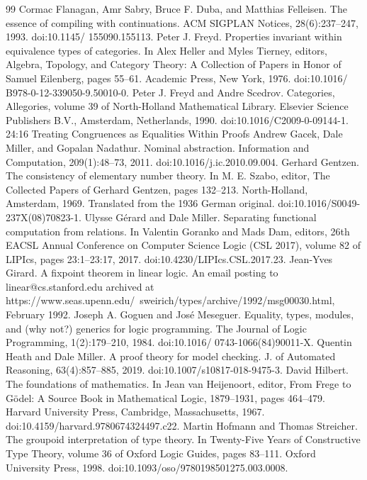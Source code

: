 \begin{thebibliography}{99}
 Cormac Flanagan, Amr Sabry, Bruce F. Duba, and Matthias Felleisen. The essence of compiling with continuations. ACM SIGPLAN Notices, 28(6):237–247, 1993. doi:10.1145/ 155090.155113.
 Peter J. Freyd. Properties invariant within equivalence types of categories. In Alex Heller and Myles Tierney, editors, Algebra, Topology, and Category Theory: A Collection of Papers in Honor of Samuel Eilenberg, pages 55–61. Academic Press, New York, 1976. doi:10.1016/ B978-0-12-339050-9.50010-0.
 Peter J. Freyd and Andre Scedrov. Categories, Allegories, volume 39 of North-Holland Mathematical Library. Elsevier Science Publishers B.V., Amsterdam, Netherlands, 1990. doi:10.1016/C2009-0-09144-1. 24:16   Treating Congruences as Equalities Within Proofs
 Andrew Gacek, Dale Miller, and Gopalan Nadathur. Nominal abstraction. Information and Computation, 209(1):48–73, 2011. doi:10.1016/j.ic.2010.09.004.
 Gerhard Gentzen. The consistency of elementary number theory. In M. E. Szabo, editor, The Collected Papers of Gerhard Gentzen, pages 132–213. North-Holland, Amsterdam, 1969. Translated from the 1936 German original. doi:10.1016/S0049-237X(08)70823-1.
 Ulysse Gérard and Dale Miller. Separating functional computation from relations. In Valentin Goranko and Mads Dam, editors, 26th EACSL Annual Conference on Computer Science Logic (CSL 2017), volume 82 of LIPIcs, pages 23:1–23:17, 2017. doi:10.4230/LIPIcs.CSL.2017.23.
 Jean-Yves Girard. A fixpoint theorem in linear logic. An email posting to linear@cs.stanford.edu archived at https://www.seas.upenn.edu/~sweirich/types/archive/1992/msg00030.html, February 1992.
 Joseph A. Goguen and José Meseguer. Equality, types, modules, and (why not?) generics for logic programming. The Journal of Logic Programming, 1(2):179–210, 1984. doi:10.1016/ 0743-1066(84)90011-X.
 Quentin Heath and Dale Miller. A proof theory for model checking. J. of Automated Reasoning, 63(4):857–885, 2019. doi:10.1007/s10817-018-9475-3.
 David Hilbert. The foundations of mathematics. In Jean van Heijenoort, editor, From Frege to Gödel: A Source Book in Mathematical Logic, 1879–1931, pages 464–479. Harvard University Press, Cambridge, Massachusetts, 1967. doi:10.4159/harvard.9780674324497.c22.
 Martin Hofmann and Thomas Streicher. The groupoid interpretation of type theory. In Twenty-Five Years of Constructive Type Theory, volume 36 of Oxford Logic Guides, pages 83–111. Oxford University Press, 1998. doi:10.1093/oso/9780198501275.003.0008.

\end{thebibliography}

